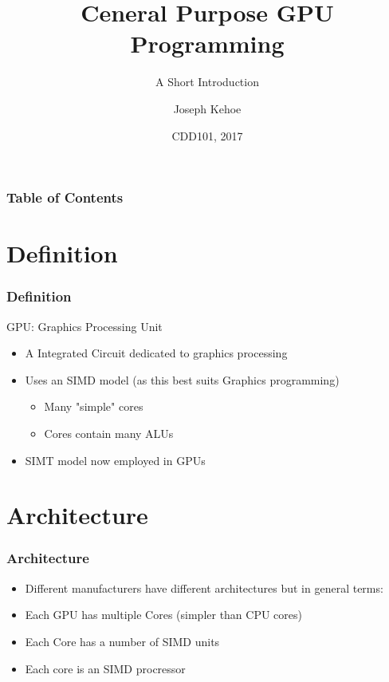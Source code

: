 \documentclass{beamer}
\title[GPGPU] %
{Ceneral Purpose GPU Programming}
\subtitle{A Short Introduction}
\author[Dr. Joseph Kehoe] %
{Joseph Kehoe\inst{1}}
\institute[IT Carlow] %
{
	\inst{1}%
	Department of Computing and Networking\\
	Institute of Technology Carlow
}
\date[ITC 2017] %
{CDD101, 2017}
\begin{document}
 
\frame{\titlepage}
 
 
 
 \begin{frame}
 	\frametitle{Table of Contents}
 	\tableofcontents
 \end{frame}
 
 
 \section{Definition}
\begin{frame}
\frametitle{Definition}
GPU: Graphics Processing Unit
\begin{itemize}
	\item A Integrated Circuit dedicated to graphics processing
	\item Uses an SIMD model (as this best suits Graphics programming)
	\begin{itemize}
		\item Many "simple" cores
		\item Cores contain many ALUs
	\end{itemize}
	\item SIMT model now employed in GPUs
\end{itemize}
\end{frame}

 \section{Architecture}
\begin{frame}
	\frametitle{Architecture}
	\begin{itemize}
		\item Different manufacturers have different architectures but in general terms:
		\item Each GPU has multiple Cores (simpler than CPU cores)
		\item Each Core has a number of SIMD units
		\item Each core is an SIMD procressor
	\end{itemize}
\end{frame}
\end{document}
